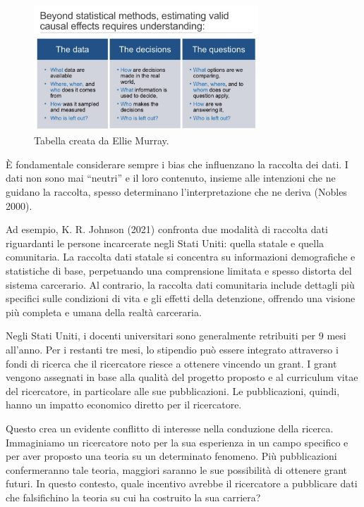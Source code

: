 \documentclass[
  letterpaper,
  krantz2]{{[}./krantz{]}}
\begin{document}
\begin{figure}[H]

{\centering \includegraphics[width=0.75\textwidth,height=\textheight]{chapters/key_notions/../../figures/data_biases.png}

}

\caption{Tabella creata da Ellie Murray.}

\end{figure}%

È fondamentale considerare sempre i bias che influenzano la raccolta dei
dati. I dati non sono mai ``neutri'' e il loro contenuto, insieme alle
intenzioni che ne guidano la raccolta, spesso determinano
l'interpretazione che ne deriva (Nobles 2000).

Ad esempio, K. R. Johnson (2021) confronta due modalità di raccolta dati
riguardanti le persone incarcerate negli Stati Uniti: quella statale e
quella comunitaria. La raccolta dati statale si concentra su
informazioni demografiche e statistiche di base, perpetuando una
comprensione limitata e spesso distorta del sistema carcerario. Al
contrario, la raccolta dati comunitaria include dettagli più specifici
sulle condizioni di vita e gli effetti della detenzione, offrendo una
visione più completa e umana della realtà carceraria.

Negli Stati Uniti, i docenti universitari sono generalmente retribuiti
per 9 mesi all'anno. Per i restanti tre mesi, lo stipendio può essere
integrato attraverso i fondi di ricerca che il ricercatore riesce a
ottenere vincendo un grant. I grant vengono assegnati in base alla
qualità del progetto proposto e al curriculum vitae del ricercatore, in
particolare alle sue pubblicazioni. Le pubblicazioni, quindi, hanno un
impatto economico diretto per il ricercatore.

Questo crea un evidente conflitto di interesse nella conduzione della
ricerca. Immaginiamo un ricercatore noto per la sua esperienza in un
campo specifico e per aver proposto una teoria su un determinato
fenomeno. Più pubblicazioni confermeranno tale teoria, maggiori saranno
le sue possibilità di ottenere grant futuri. In questo contesto, quale
incentivo avrebbe il ricercatore a pubblicare dati che falsifichino la
teoria su cui ha costruito la sua carriera?
\end{document}
